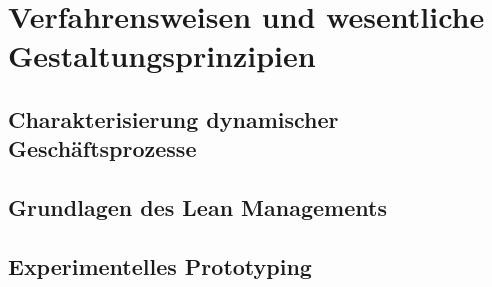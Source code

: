 \section{Verfahrensweisen und wesentliche Gestaltungsprinzipien}

\subsection{Charakterisierung dynamischer Geschäftsprozesse}

\subsection{Grundlagen des Lean Managements}

\subsection{Experimentelles Prototyping}
